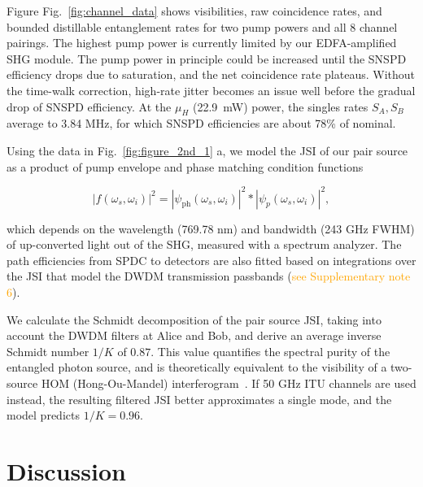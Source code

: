 \documentclass[11pt]{caltech_thesis} %
\begin{document}
Figure Fig.~\ref{fig:channel_data} shows visibilities, raw coincidence rates, and bounded distillable entanglement rates for two pump powers and all 8 channel pairings. The highest pump power is currently limited by our EDFA-amplified SHG module. The pump power in principle could be increased until the SNSPD efficiency drops due to saturation, and the net coincidence rate plateaus. Without the time-walk correction, high-rate jitter becomes an issue well before the gradual drop of SNSPD efficiency. At the $\mu_H$ (22.9~mW) power, the singles rates $S_A, S_B$ average to 3.84 MHz, for which SNSPD efficiencies are about 78\% of nominal.

Using the data in Fig.~\ref{fig:figure_2nd_1} a, we model the JSI of our pair source as a product of pump envelope and phase matching condition functions

$$
|f(\omega_s, \omega_i)|^2 = |\psi_{\mathrm{ph}}\left(\omega_s, \omega_i\right)|^2 *|\psi_p\left(\omega_s, \omega_i\right)|^2,
$$

which depends on the wavelength (769.78 nm) and bandwidth (243 GHz FWHM) of up-converted light out of the SHG, measured with a spectrum analyzer. The path efficiencies from SPDC to detectors are also fitted based on integrations over the JSI that model the DWDM transmission passbands (\textcolor{orange}{see Supplementary note 6}).

We calculate the Schmidt decomposition of the pair source JSI, taking into account the DWDM filters at Alice and Bob, and derive an average inverse Schmidt number $1/K$ of $0.87$. This value quantifies the spectral purity of the entangled photon source, and is theoretically equivalent to the visibility of a two-source HOM (Hong-Ou-Mandel) interferogram~\autocite{mandel1995optical}. If 50 GHz ITU channels are used instead, the resulting filtered JSI better approximates a single mode, and the model predicts $1/K = 0.96$.

\hypertarget{discussion-1}{%
\section{Discussion}\label{discussion-1}}
\end{document}
